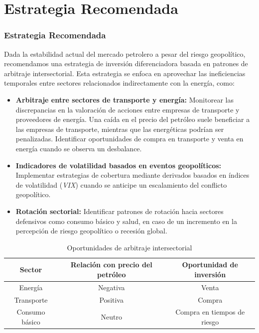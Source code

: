 \documentclass{beamer}
\begin{document}
\section{Estrategia Recomendada}
\begin{frame}[allowframebreaks] 
\frametitle{Estrategia Recomendada}

Dada la estabilidad actual del mercado petrolero a pesar del riesgo geopolítico, recomendamos una estrategia de inversión diferenciadora basada en patrones de arbitraje intersectorial. Esta estrategia se enfoca en aprovechar las ineficiencias temporales entre sectores relacionados indirectamente con la energía, como:

\begin{itemize}
    \item \textbf{Arbitraje entre sectores de transporte y energía:} Monitorear las discrepancias en la valoración de acciones entre empresas de transporte y proveedores de energía. Una caída en el precio del petróleo suele beneficiar a las empresas de transporte, mientras que las energéticas podrían ser penalizadas. Identificar oportunidades de compra en transporte y venta en energía cuando se observa un desbalance.
    \item \textbf{Indicadores de volatilidad basados en eventos geopolíticos:} Implementar estrategias de cobertura mediante derivados basados en índices de volatilidad (\emph{VIX}) cuando se anticipe un escalamiento del conflicto geopolítico.
    \item \textbf{Rotación sectorial:} Identificar patrones de rotación hacia sectores defensivos como consumo básico y salud, en caso de un incremento en la percepción de riesgo geopolítico o recesión global.
\end{itemize}

\begin{table}[]
    \centering
    \caption{Oportunidades de arbitraje intersectorial}
    \begin{tabular}{|c|c|c|}
    \hline
    Sector        & Relación con precio del petróleo & Oportunidad de inversión \\
    \hline
    Energía       & Negativa                         & Venta \\
    Transporte    & Positiva                         & Compra \\
    Consumo básico & Neutro                          & Compra en tiempos de riesgo \\
    \hline
    \end{tabular}
\end{table}

\end{frame}
\end{document}
